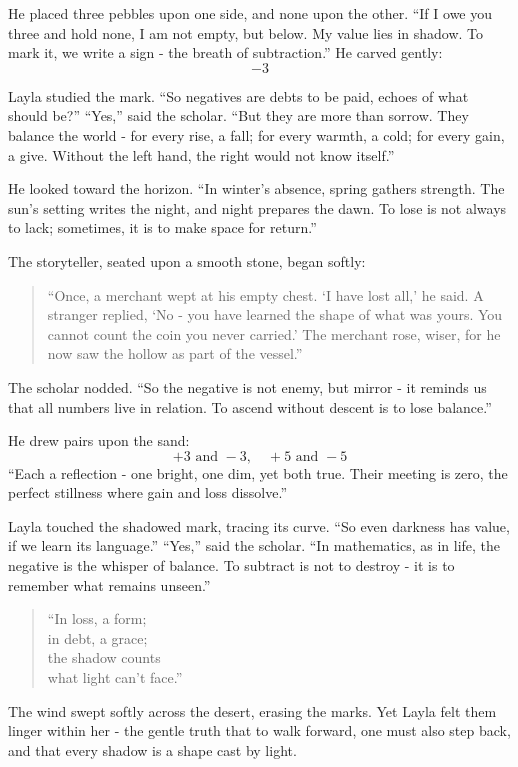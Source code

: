 \documentclass[
  letterpaper,
  DIV=11,
  numbers=noendperiod]{scrreprt}
\begin{document}
He placed three pebbles upon one side, and none upon the other. ``If I
owe you three and hold none, I am not empty, but below. My value lies in
shadow. To mark it, we write a sign - the breath of subtraction.'' He
carved gently: \[
-3
\]

Layla studied the mark. ``So negatives are debts to be paid, echoes of
what should be?'' ``Yes,'' said the scholar. ``But they are more than
sorrow. They balance the world - for every rise, a fall; for every
warmth, a cold; for every gain, a give. Without the left hand, the right
would not know itself.''

He looked toward the horizon. ``In winter's absence, spring gathers
strength. The sun's setting writes the night, and night prepares the
dawn. To lose is not always to lack; sometimes, it is to make space for
return.''

The storyteller, seated upon a smooth stone, began softly:

\begin{quote}
``Once, a merchant wept at his empty chest. `I have lost all,' he said.
A stranger replied, `No - you have learned the shape of what was yours.
You cannot count the coin you never carried.' The merchant rose, wiser,
for he now saw the hollow as part of the vessel.''
\end{quote}

The scholar nodded. ``So the negative is not enemy, but mirror - it
reminds us that all numbers live in relation. To ascend without descent
is to lose balance.''

He drew pairs upon the sand: \[
+3 \text{ and } -3,\quad +5 \text{ and } -5
\] ``Each a reflection - one bright, one dim, yet both true. Their
meeting is zero, the perfect stillness where gain and loss dissolve.''

Layla touched the shadowed mark, tracing its curve. ``So even darkness
has value, if we learn its language.'' ``Yes,'' said the scholar. ``In
mathematics, as in life, the negative is the whisper of balance. To
subtract is not to destroy - it is to remember what remains unseen.''

\begin{quote}
``In loss, a form;\\
in debt, a grace;\\
the shadow counts\\
what light can't face.''
\end{quote}

The wind swept softly across the desert, erasing the marks. Yet Layla
felt them linger within her - the gentle truth that to walk forward, one
must also step back, and that every shadow is a shape cast by light.
\end{document}
